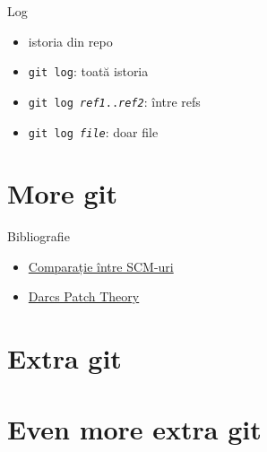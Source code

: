 \documentclass{beamer}
\begin{document}
\begin{frame}{Log}
  \begin{itemize}
    \item istoria din repo
    \item \texttt{git log}: toată istoria
    \item \texttt{git log \textit{ref1}..\textit{ref2}}: între refs
    \item \texttt{git log \textit{file}}: doar file
  \end{itemize}
\end{frame}

\section{More git}

\begin{frame}{Bibliografie}
  \begin{itemize}
    \item \href{http://en.wikipedia.org/wiki/Comparison_of_revision_control_software}{Comparație între SCM-uri}
    \item \href{http://en.wikibooks.org/wiki/Understanding_Darcs/Patch_theory}{Darcs Patch Theory}
  \end{itemize}
\end{frame}

\section{Extra git}
\section{Even more extra git}


%

%

%
\end{document}
